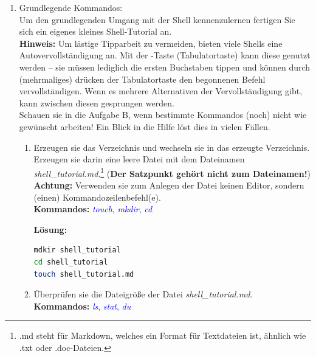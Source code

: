 \documentclass[paper=a4,fontsize=11pt]{scrartcl}%
\numberwithin{equation}{section}
\newenvironment{solution}
	{
		\color{blue}
		\textbf{Lösung:}
	}{}
\begin{document}
\begin{enumerate}
\begin{enumerate}[label=(\alph*)]
	\end{enumerate}
	\item Grundlegende Kommandos:\\
  Um den grundlegenden Umgang mit der Shell kennenzulernen fertigen Sie sich ein eigenes kleines Shell-Tutorial an.\\
  \textbf{Hinweis:} Um lästige Tipparbeit zu vermeiden, bieten viele Shells eine Autovervollständigung an. Mit der \keys{\tab}-Taste (Tabulatortaste) kann diese genutzt werden -- sie müssen lediglich die ersten Buchstaben tippen und können durch (mehrmaliges) drücken der Tabulatortaste den begonnenen Befehl vervollständigen. Wenn es mehrere Alternativen der Vervollständigung gibt, kann zwischen diesen gesprungen werden.\\
  Schauen sie in die Aufgabe B, wenn bestimmte Kommandos (noch) nicht wie gewünscht arbeiten! Ein Blick in die Hilfe löst dies in vielen Fällen.
  	\begin{enumerate}[label=(\alph*)]
  		\item Erzeugen sie das Verzeichnis  und wechseln sie in das erzeugte Verzeichnis. Erzeugen sie darin eine leere Datei mit dem Dateinamen \textit{shell\_tutorial.md}.\footnote{.md steht für Markdown, welches ein Format für Textdateien ist, ähnlich wie .txt oder .doc-Dateien.} (\textbf{Der Satzpunkt gehört nicht zum Dateinamen!})\\
        \textbf{Achtung:} Verwenden sie zum Anlegen der Datei keinen Editor, sondern (einen) Kommandozeilenbefehl(e).\\
        \textbf{Kommandos:} \textcolor{blue}{\emph{touch}, \emph{mkdir}, \emph{cd}}
        
        \begin{solution}
        \begin{lstlisting}[style=Bash, language=Bash]
mdkir shell_tutorial
cd shell_tutorial
touch shell_tutorial.md
		\end{lstlisting}
		\end{solution}
		\item Überprüfen sie die Dateigröße der Datei \textit{shell\_tutorial.md}.\\
		\textbf{Kommandos:} \textcolor{blue}{\emph{ls}, \emph{stat}, \emph{du}}
		

\end{enumerate}
\end{enumerate}
\end{document}
